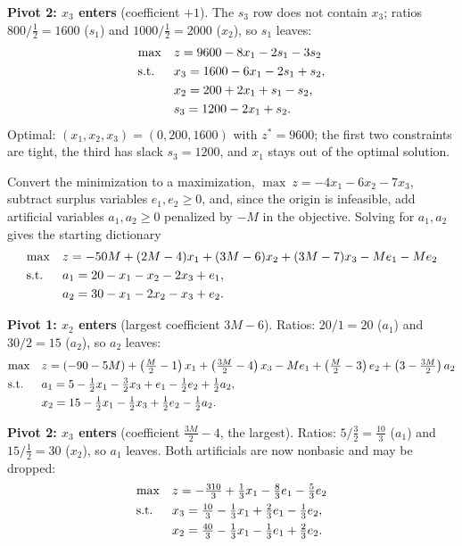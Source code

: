 \textbf{Pivot 2: $x_3$ enters} (coefficient $+1$). The $s_3$ row does not
contain $x_3$; ratios $800/\tfrac12 = 1600$ ($s_1$) and
$1000/\tfrac12 = 2000$ ($x_2$), so $s_1$ leaves:
\[
\begin{aligned}
\max\quad & z = 9600 - 8x_1 - 2s_1 - 3s_2 \\
\text{s.t.}\;\;\quad & x_3 = 1600 - 6x_1 - 2s_1 + s_2, \\
& x_2 = 200 + 2x_1 + s_1 - s_2, \\
& s_3 = 1200 - 2x_1 + s_2.
\end{aligned}
\]
Optimal: $(x_1, x_2, x_3) = (0, 200, 1600)$ with $z^* = 9600$; the first
two constraints are tight, the third has slack $s_3 = 1200$, and $x_1$
stays out of the optimal solution.


Convert the minimization to a maximization, $\max\ z = -4x_1 - 6x_2 - 7x_3$,
subtract surplus variables $e_1, e_2 \geq 0$, and, since the origin is
infeasible, add artificial variables $a_1, a_2 \geq 0$ penalized by $-M$
in the objective. Solving for $a_1, a_2$ gives the starting dictionary
\[
\begin{aligned}
\max\quad & z = -50M + (2M - 4)x_1 + (3M - 6)x_2 + (3M - 7)x_3 - M e_1 - M e_2 \\
\text{s.t.}\;\;\quad & a_1 = 20 - x_1 - x_2 - 2x_3 + e_1, \\
& a_2 = 30 - x_1 - 2x_2 - x_3 + e_2.
\end{aligned}
\]

\textbf{Pivot 1: $x_2$ enters} (largest coefficient $3M - 6$). Ratios:
$20/1 = 20$ ($a_1$) and $30/2 = 15$ ($a_2$), so $a_2$ leaves:
\[
\begin{aligned}
\max\quad & z = (-90 - 5M) + \left(\tfrac{M}{2} - 1\right)x_1
  + \left(\tfrac{3M}{2} - 4\right)x_3 - M e_1
  + \left(\tfrac{M}{2} - 3\right)e_2 + \left(3 - \tfrac{3M}{2}\right)a_2 \\
\text{s.t.}\;\;\quad & a_1 = 5 - \tfrac12 x_1 - \tfrac32 x_3 + e_1 - \tfrac12 e_2 + \tfrac12 a_2, \\
& x_2 = 15 - \tfrac12 x_1 - \tfrac12 x_3 + \tfrac12 e_2 - \tfrac12 a_2.
\end{aligned}
\]

\textbf{Pivot 2: $x_3$ enters} (coefficient $\tfrac{3M}{2} - 4$, the
largest). Ratios: $5/\tfrac32 = \tfrac{10}{3}$ ($a_1$) and
$15/\tfrac12 = 30$ ($x_2$), so $a_1$ leaves. Both artificials are now
nonbasic and may be dropped:
\[
\begin{aligned}
\max\quad & z = -\tfrac{310}{3} + \tfrac13 x_1 - \tfrac83 e_1 - \tfrac53 e_2 \\
\text{s.t.}\;\;\quad & x_3 = \tfrac{10}{3} - \tfrac13 x_1 + \tfrac23 e_1 - \tfrac13 e_2, \\
& x_2 = \tfrac{40}{3} - \tfrac13 x_1 - \tfrac13 e_1 + \tfrac23 e_2.
\end{aligned}
\]

